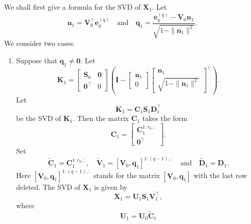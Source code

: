 \documentclass[11pt,a4paper]{article}
\theoremstyle{mybreak}
\numberwithin{dummy}{section}
\theoremstyle{plain}
\theoremstyle{plain}
\theoremstyle{plain}
\theoremstyle{plain}
\theoremstyle{MyNonumberplain}
\newcommand{\0}{\M{0}}
\newcommand{\M}[1]{\mathbf{#1}}
\newcommand{\Mt}[1]{\tilde{\M{#1}}}
\newcommand{\T}{\top}
\newcommand{\ve}[1]{\mathbf{#1}}
\newcommand{\eve}[2]{\mathbf{e}^{(#1)}_{#2}}
\begin{document}
We shall first give a formula for the SVD of $\M{X}_1$. Let
\begin{displaymath}
  \ve{n}_1 = \M{V}_0^\T \eve{q}{q}
  \quad
  \text{and}
  \quad
  \ve{q}_1 =  \frac{\eve{q}{q} - \M{V}_0 \ve{n}_1}{\sqrt{1 - \| \ve{n}_1\|^2}}.
\end{displaymath}
We consider two cases.
\begin{enumerate}[font=\upshape,label=(\roman*),wide,align=right]
\item Suppose that $\ve{q}_1 \neq \0$. Let
  \begin{displaymath}
    \M{K}_1
    =
    \begin{bmatrix}
      \M{S}_0 & \0
      \\
      \0^\T & 0
    \end{bmatrix}
    \left(
      \M{I}
      -
      \begin{bmatrix}
        \ve{n}_1
        \\
        0
      \end{bmatrix}
      \begin{bmatrix}
        \ve{n}_1
        \\
        \sqrt{1 - \| \ve{n}_1 \|^2}
      \end{bmatrix}^\T \right).
  \end{displaymath}
  Let
  \begin{displaymath}
    \M{K}_1 = \M{C}_1 \M{S}_1  \M{D}_1^\T
  \end{displaymath}
  be the SVD of $\M{K}_1$.  Then the matrix $\M{C}_1$ takes the form
  \begin{displaymath}
    \M{C}_1
    =
    \begin{bmatrix}
      \M{C}_1^{1:r_0, :}
      \\
      \0^\T
    \end{bmatrix}.
  \end{displaymath}
  Set
  \begin{displaymath}
    \Mt{C}_1 = \M{C}^{1:r_0,:}_1,
    \quad
    \Mt{V}_1 = [\M{V}_0, \ve{q}_1]^{1:(q - 1),:}
    \quad
    \text{and}
    \quad
    \Mt{D}_1 = \M{D}_1.
  \end{displaymath}
  Here $[\M{V}_0, \ve{q}_1]^{1:(q - 1),:}$ stands for the matrix $[\M{V}_0, \ve{q}_1]$ with the last row deleted. The SVD of $\M{X}_1$ is given by
  \begin{displaymath}
    \M{X}_1 = \M{U}_1 \M{S}_1\M{V}_1^\T,
  \end{displaymath}
  where
  \begin{displaymath}
    \M{U}_1 = \M{U}_0 \Mt{C}_1

\end{displaymath}
\end{enumerate}
\end{document}
